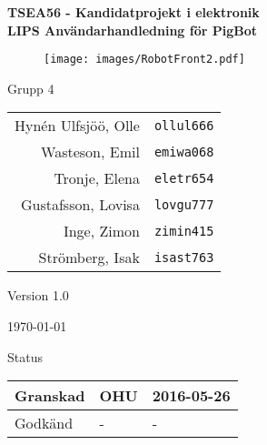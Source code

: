 \documentclass[11pt]{article}
\begin{document}
\begin{titlepage}
\begin{center}


{\Large\bfseries TSEA56 - Kandidatprojekt i elektronik \\ LIPS Användarhandledning för PigBot}

\begin{figure}[!htbp]
  \begin{center}
    \texttt{[image: images/RobotFront2.pdf]}
  \end{center}
\end{figure}


  \begin{minipage}{0.5\textwidth}
    \centering
 Grupp 4 \\
\begin{tabular}{rl}
Hynén Ulfsjöö, Olle&\verb+ollul666+
\\
Wasteson, Emil&\verb+emiwa068+
\\
Tronje, Elena&\verb+eletr654+
\\
Gustafsson, Lovisa&\verb+lovgu777+
\\
Inge, Zimon&\verb+zimin415+
\\
Strömberg, Isak&\verb+isast763+
\\
\end{tabular}
\end{minipage}%
\begin{minipage}{0.5\textwidth}
  \centering
Version 1.0

\today
\vspace{2em}

Status
\begin{longtable}{|l|l|l|} \hline

Granskad & OHU & 2016-05-26 \\ \hline
Godkänd & - & - \\ \hline
 
\end{longtable}
\end{minipage}


\end{center}
\end{titlepage}
\end{document}
